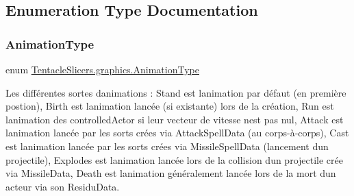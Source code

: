 \subsection{Enumeration Type Documentation}
\mbox{\label{namespace_tentacle_slicers_1_1graphics_a9c92bd633d714099730f10897a01950b}} 
\subsubsection{\texorpdfstring{Animation\+Type}{AnimationType}}
{\footnotesize\ttfamily enum \hyperlink{namespace_tentacle_slicers_1_1graphics_a9c92bd633d714099730f10897a01950b}{Tentacle\+Slicers.\+graphics.\+Animation\+Type}\hspace{0.3cm}{\ttfamily [strong]}}



Les différentes sortes d\textquotesingle{}animations \+: Stand est l\textquotesingle{}animation par défaut (en première postion), Birth est l\textquotesingle{}animation lancée (si existante) lors de la création, Run est l\textquotesingle{}animation des controlled\+Actor si leur vecteur de vitesse n\textquotesingle{}est pas nul, Attack est l\textquotesingle{}animation lancée par les sorts crées via Attack\+Spell\+Data (au corps-\/à-\/corps), Cast est l\textquotesingle{}animation lancée par les sorts crées via Missile\+Spell\+Data (lancement d\textquotesingle{}un projectile), Explodes est l\textquotesingle{}animation lancée lors de la collision d\textquotesingle{}un projectile crée via Missile\+Data, Death est l\textquotesingle{}animation généralement lancée lors de la mort d\textquotesingle{}un acteur via son Residu\+Data. 

